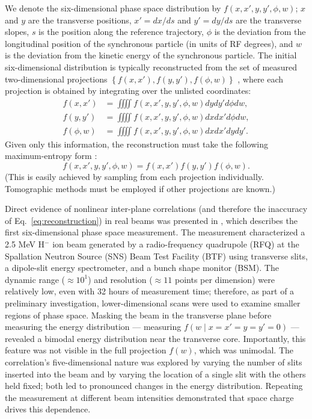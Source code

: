 \documentclass[%
 reprint,
 amsmath,amssymb,
 aps,
prstab,
]{revtex4-2}
\begin{document}
We denote the six-dimensional phase space distribution by $f(x, x', y, y', \phi, w)$; $x$ and $y$ are the transverse positions, $x' = dx / ds$ and $y' = dy / ds$ are the transverse slopes, $s$ is the position along the reference trajectory, $\phi$ is the deviation from the longitudinal position of the synchronous particle (in units of RF degrees), and $w$ is the deviation from the kinetic energy of the synchronous particle. The initial six-dimensional distribution is typically reconstructed from the set of measured two-dimensional projections $\left\{{f(x, x'), f(y, y'), f(\phi, w)}\right\}$ \cite{Groening2008}, where each projection is obtained by integrating over the unlisted coordinates:
%
\begin{equation}
    \begin{aligned}
        f(x, x') &= \iiiint
        f(x, x', y, y', \phi, w) {dy}{dy'}{d\phi}{dw}, \\
        f(y, y') &= \iiiint
        f(x, x', y, y', \phi, w) {dx}{dx'}{d\phi}{dw}, \\
        f(\phi, w) &= \iiiint
        f(x, x', y, y', \phi, w) {dx}{dx'}{dy}{dy'}.
    \end{aligned}
\end{equation}
%
Given only this information, the reconstruction must take the following maximum-entropy form \cite{Wong2022-tomography}:
%
\begin{equation}\label{eq:reconstruction}
    f(x, x', y, y', \phi, w) = f(x, x') f(y, y') f(\phi, w). 
\end{equation}
%
(This is easily achieved by sampling from each projection individually. Tomographic methods must be employed if other projections are known.)

Direct evidence of nonlinear inter-plane correlations (and therefore the inaccuracy of Eq.~\eqref{eq:reconstruction}) in real beams was presented in \cite{Cathey2018}, which describes the first six-dimensional phase space measurement. The measurement characterized a 2.5 MeV H$^-$ ion beam generated by a radio-frequency quadrupole (RFQ) at the Spallation Neutron Source (SNS) Beam Test Facility (BTF) using transverse slits, a dipole-slit energy spectrometer, and a bunch shape monitor (BSM). The dynamic range ($\approx 10^1$) and resolution ($\approx 11$ points per dimension) were relatively low, even with 32 hours of measurement time; therefore, as part of a preliminary investigation, lower-dimensional scans were used to examine smaller regions of phase space. Masking the beam in the transverse plane before measuring the energy distribution --- measuring $f(w \mid x{=}x'{=}y{=}y'{=}0)$ --- revealed a bimodal energy distribution near the transverse core. Importantly, this feature was not visible in the full projection $f(w)$, which was unimodal. The correlation's five-dimensional nature was explored by varying the number of slits inserted into the beam and by varying the location of a single slit with the others held fixed; both led to pronounced changes in the energy distribution. Repeating the measurement at different beam intensities demonstrated that space charge drives this dependence.
\end{document}
